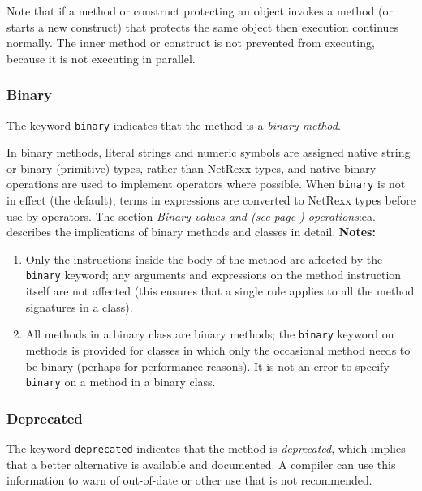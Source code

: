Note that if a method or construct protecting an object invokes a method
(or starts a new construct) that protects the same object then execution
continues normally.  The inner method or construct is not prevented from
executing, because it is not executing in parallel.
\subsubsection{Binary}\label{"id"}
 
The keyword \texttt{binary} indicates that the method is a \emph{binary
method}.
 
In binary methods, literal strings and numeric symbols are assigned
native string or binary (primitive) types, rather than NetRexx types,
and native binary operations are used to implement operators where
possible.
When \texttt{binary} is not in effect (the default), terms in
expressions are converted to NetRexx types before use by operators.
The section  \emph{Binary values and (see page \pageref{refbinary}) 
operations}:ea. describes the implications of binary methods and
classes in detail.
 \textbf{Notes:}
\begin{enumerate}
\item 
Only the instructions inside the body of the method are affected by the
\texttt{binary} keyword; any arguments and expressions on the method
instruction itself are not affected (this ensures that a single rule
applies to all the method signatures in a class).
\item 
All methods in a binary class are binary methods; the \texttt{binary}
keyword on methods is provided for classes in which only the occasional
method needs to be binary (perhaps for performance reasons).
It is not an error to specify \texttt{binary} on a method in a binary
class.
\end{enumerate}
\subsubsection{Deprecated}\label{"id"}
 
The keyword \texttt{deprecated} indicates that the method
is \emph{deprecated}, which implies that a better alternative is
available and documented.  A compiler can use this information to warn
of out-of-date or other use that is not recommended.
 
